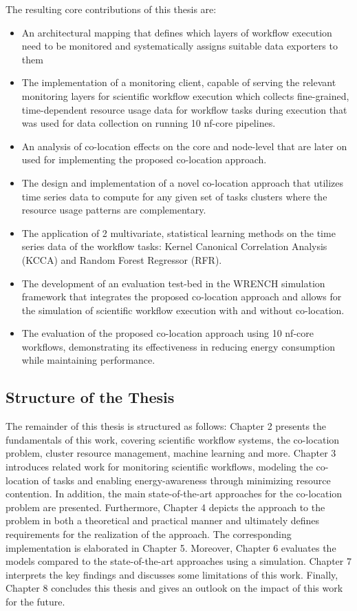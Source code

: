 The resulting core contributions of this thesis are:
\begin{itemize}
    \item An architectural mapping that defines which layers of workflow execution need to be monitored and systematically assigns suitable data exporters to them
    \item The implementation of a monitoring client, capable of serving the relevant monitoring layers for scientific workflow execution which collects fine-grained, time-dependent resource usage data for workflow tasks during execution that was used for data collection on running 10 nf-core pipelines. 
    \item An analysis of co-location effects on the core and node-level that are later on used for implementing the proposed co-location approach.
    \item The design and implementation of a novel co-location approach that utilizes time series data to compute for any given set of tasks clusters where the resource usage patterns are complementary.
    \item The application of 2 multivariate, statistical learning methods on the time series data of the workflow tasks: Kernel Canonical Correlation Analysis (KCCA) and Random Forest Regressor (RFR).
    \item The development of an evaluation test-bed in the WRENCH simulation framework that integrates the proposed co-location approach and allows for the simulation of scientific workflow execution with and without co-location.
    \item The evaluation of the proposed co-location approach using 10 nf-core workflows, demonstrating its effectiveness in reducing energy consumption  while maintaining performance.
\end{itemize}

\subsection{Structure of the Thesis}
\label{subse:structure_of_the_thesis}
The remainder of this thesis is structured as follows: Chapter 2 presents the fundamentals of this work, covering scientific workflow systems, the co-location problem, cluster resource management, machine learning and more. Chapter 3 introduces related work for monitoring scientific workflows, modeling the co-location of tasks and enabling energy-awareness through minimizing resource contention. In addition, the main state-of-the-art approaches for the co-location problem are presented. Furthermore, Chapter 4 depicts the approach to the problem in both a theoretical and practical manner and ultimately defines requirements for the realization of the approach. The corresponding implementation is elaborated in Chapter 5. Moreover, Chapter 6 evaluates the models compared to the state-of-the-art approaches using a simulation. Chapter 7 interprets the key findings and discusses some limitations of this work. Finally, Chapter 8 concludes this thesis and gives an outlook on the impact of this work for the future.